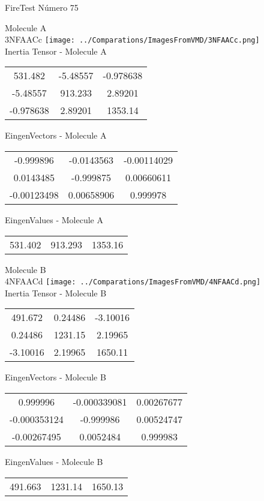 \vtab[-2cm]
\begin{center}
{\large FireTest \tab Número 75}
\end{center}
\begin{multicols}{2}
\begin{center}

Molecule A \\ 
3NFAACc
\texttt{[image: ../Comparations/ImagesFromVMD/3NFAACc.png]}
\\
Inertia Tensor - Molecule A \\
\vtab

\begin{tabular}{|c c c|}
531.482	 & 	-5.48557	 & 	-0.978638	 \\
-5.48557	 & 	913.233	 & 	2.89201	 \\
-0.978638	 & 	2.89201	 & 	1353.14
\end{tabular}

\vtab
 EingenVectors - Molecule A     \\
\vtab
\begin{tabular}{|c c c|}
-0.999896	 & 	-0.0143563	 & 	-0.00114029	 \\
0.0143485	 & 	-0.999875	 & 	0.00660611	 \\
-0.00123498	 & 	0.00658906	 & 	0.999978
\end{tabular}

\vtab
 EingenValues - Molecule A     \\
\vtab
\begin{tabular}{|c c c|}
531.402	 & 	913.293	 & 	1353.16	 \\
\end{tabular}
\columnbreak

Molecule B \\ 
4NFAACd
\texttt{[image: ../Comparations/ImagesFromVMD/4NFAACd.png]}
\\
Inertia Tensor - Molecule B \\
\vtab

\begin{tabular}{|c c c|}
491.672	 & 	0.24486	 & 	-3.10016	 \\
0.24486	 & 	1231.15	 & 	2.19965	 \\
-3.10016	 & 	2.19965	 & 	1650.11
\end{tabular}

\vtab
 EingenVectors - Molecule B     \\
\vtab
\begin{tabular}{|c c c|}
0.999996	 & 	-0.000339081	 & 	0.00267677	 \\
-0.000353124	 & 	-0.999986	 & 	0.00524747	 \\
-0.00267495	 & 	0.0052484	 & 	0.999983
\end{tabular}

\vtab
 EingenValues - Molecule B     \\
\vtab
\begin{tabular}{|c c c|}
491.663	 & 	1231.14	 & 	1650.13	 \\
\end{tabular}

\end{center}
\end{multicols}
